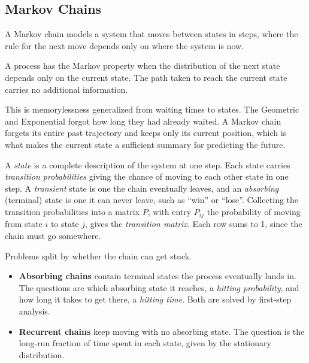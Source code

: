 \subsection{Markov Chains}

A Markov chain models a system that moves between states in steps, where the rule for the next move depends only on where the system is now.

\begin{definition}
A process has the Markov property when the distribution of the next state depends only on the current state. The path taken to reach the current state carries no additional information.
\end{definition}

This is memorylessness generalized from waiting times to states. The Geometric and Exponential forgot how long they had already waited. A Markov chain forgets its entire past trajectory and keeps only its current position, which is what makes the current state a sufficient summary for predicting the future.

\begin{definition}
A \textit{state} is a complete description of the system at one step. Each state carries \textit{transition probabilities} giving the chance of moving to each other state in one step. A \textit{transient} state is one the chain eventually leaves, and an \textit{absorbing} (terminal) state is one it can never leave, such as ``win'' or ``lose''. Collecting the transition probabilities into a matrix $P$, with entry $P_{ij}$ the probability of moving from state $i$ to state $j$, gives the \textit{transition matrix}. Each row sums to 1, since the chain must go somewhere.
\end{definition}

\vspace{1em}

\begin{keybox}
Problems split by whether the chain can get stuck.
\begin{itemize}[itemsep=1ex, label=--]
  \item \textbf{Absorbing chains} contain terminal states the process eventually lands in. The questions are which absorbing state it reaches, a \textit{hitting probability}, and how long it takes to get there, a \textit{hitting time}. Both are solved by first-step analysis.
  \item \textbf{Recurrent chains} keep moving with no absorbing state. The question is the long-run fraction of time spent in each state, given by the stationary distribution.
\end{itemize}
\end{keybox}

